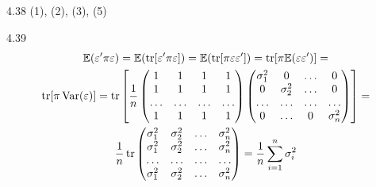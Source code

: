 \protect \hypertarget {soln:4.38}{}
\begin{solution}{{4.38}}
(1), (2), (3), (5)
\end{solution}
\protect \hypertarget {soln:4.39}{}
\begin{solution}{{4.39}}
\begin{multline*}
\mathbb{E}(\varepsilon' \pi \varepsilon) = \mathbb{E}(\operatorname{tr}[\varepsilon' \pi \varepsilon]) = \mathbb{E}(\operatorname{tr}[\pi \varepsilon \varepsilon']) = \operatorname{tr}[\pi \mathbb{E}(\varepsilon\varepsilon')]  =\\
\operatorname{tr}[\pi \operatorname{Var}(\varepsilon)] = \operatorname{tr}\left[ \frac{1}{n} \begin{pmatrix}
1 & 1 & 1 & 1 \\
1 & 1 & 1 & 1 \\
\ldots & \ldots & \ldots & \ldots \\
1 & 1 & 1 & 1 \\
\end{pmatrix} \begin{pmatrix}
\sigma_1^2 & 0 & \ldots & 0 \\
0 & \sigma_2^2 & \ldots & 0 \\
\ldots & \ldots & \ldots & \ldots \\
0 & \ldots & 0 & \sigma_n^2 \\
\end{pmatrix} \right] = \\
\frac{1}{n} \operatorname{tr}\begin{pmatrix}
\sigma_1^2 & \sigma_2^2 & \ldots & \sigma_n^2 \\
\sigma_1^2 & \sigma_2^2 & \ldots & \sigma_n^2 \\
\ldots & \ldots & \ldots & \ldots \\
\sigma_1^2 & \sigma_2^2 & \ldots & \sigma_n^2 \\
\end{pmatrix} = \frac{1}{n} \sum_{i=1}^n \sigma_i^2
\end{multline*}
\end{solution}
\protect \hypertarget {soln:4.40}{}
